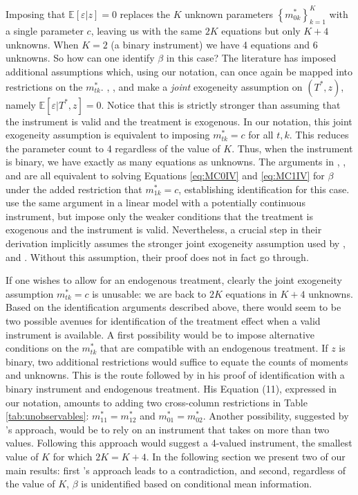 Imposing that $\mathbb{E}[\varepsilon|z]=0$ replaces the $K$ unknown parameters $\left\{ m^*_{0k}\right\}_{k=1}^K $ with a single parameter $c$, leaving us with the same $2K$ equations but only $K+4$ unknowns.
When $K=2$ (a binary instrument) we have 4 equations and 6 unknowns.
So how can one identify $\beta$ in this case?
The literature has imposed additional assumptions which, using our notation, can once again be mapped into restrictions on the $m_{tk}^*$.
\cite{BBS}, \cite{KRS}, and \cite{Mahajan} make a \emph{joint} exogeneity assumption on $(T^*,z)$, namely $\mathbb{E}[\varepsilon|T^*,z]=0$.
Notice that this is strictly stronger than assuming that the instrument is valid and the treatment is exogenous.
In our notation, this joint exogeneity assumption is equivalent to imposing $m_{tk}^*=c$ for all $t,k$.
This reduces the parameter count to 4 regardless of the value of $K$.
Thus, when the instrument is binary, we have exactly as many equations as unknowns.
The arguments in \cite{BBS}, \cite{KRS}, and \cite{Mahajan} are all equivalent to solving Equations \ref{eq:MC0IV} and \ref{eq:MC1IV} for $\beta$ under the added restriction that $m^*_{1k}=c$, establishing identification for this case.
\cite{FL} use the same argument in a linear model with a potentially continuous instrument, but impose only the weaker conditions that the treatment is exogenous and the instrument is valid. 
Nevertheless, a crucial step in their derivation implicitly assumes the stronger joint exogeneity assumption used by \cite{BBS}, \cite{KRS} and \cite{Mahajan}.
Without this assumption, their proof does not in fact go through.

If one wishes to allow for an endogenous treatment, clearly the joint exogeneity assumption $m_{tk}^*=c$ is unusable: we are back to $2K$ equations in $K+4$ unknowns.
Based on the identification arguments described above, there would seem to be two possible avenues for identification of the treatment effect when a valid instrument is available.
A first possibility would be to impose alternative conditions on the $m^*_{tk}$ that are compatible with an endogenous treatment.
If $z$ is binary, two additional restrictions would suffice to equate the counts of moments and unknowns.
This is the route followed by \cite{Mahajan} in his proof of identification with a binary instrument and endogenous treatment.
His Equation (11), expressed in our notation, amounts to adding two cross-column restrictions in Table \ref{tab:unobservables}: $m^*_{11} = m^*_{12}$ and $m^*_{01} = m^*_{02}$. 
Another possibility, suggested by \citeauthor{Lewbel}'s approach, would be to rely on an instrument that takes on more than two values.
Following this approach would suggest a 4-valued instrument, the smallest value of $K$ for which $2K = K+4$.
In the following section we present two of our main results: first \citeauthor{Mahajan}'s approach leads to a contradiction, and second, regardless of the value of $K$, $\beta$ is unidentified based on conditional mean information.



